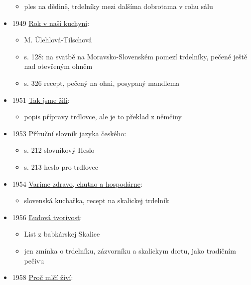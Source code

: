 \begin{itemize}
  \begin{itemize}
  \tightlist
  \item
    ples na dědině, trdelníky mezi dalšíma dobrotama v rohu sálu
  \end{itemize}
\item
  1949
  \href{https://ceskadigitalniknihovna.cz/uuid/uuid:3c65e0dc-eea0-4315-9819-a34d4fe39616}{Rok
  v naší kuchyni}:

  \begin{itemize}
  \tightlist
  \item
    M. Úlehlová-Tilschová
  \item
    s. 128: na svatbě na Moravsko-Slovenském pomezí trdelníky, pečené
    ještě nad otevřeným ohněm
  \item
    s. 326 recept, pečený na ohni, posypaný mandlema
  \end{itemize}
\item
  1951
  \href{https://ceskadigitalniknihovna.cz/view/uuid:20d0de00-02ba-11e5-9506-005056827e51?page=uuid\%3Ad5741950-0ec5-11e5-b562-005056827e51&fulltext=trdlovec*\%20OR\%20trdlovcem&source=mzk}{Tak
  jsme žili}:

  \begin{itemize}
  \tightlist
  \item
    popis přípravy trdlovce, ale je to překlad z němčiny
  \end{itemize}
\item
  1953
  \href{https://ceskadigitalniknihovna.cz/uuid/uuid:b65792bb-dbc4-4d41-b1da-e0aec484459d}{Příruční
  slovník jazyka českého}:

  \begin{itemize}
  \tightlist
  \item
    s. 212 slovníkový Heslo
  \item
    s. 213 heslo pro trdlovec
  \end{itemize}
\item
  1954
  \href{https://dikda.snk.sk/uuid/uuid:38df4d2e-5eea-4484-9e22-e5a1080ba4e3}{Varíme
  zdravo, chutno a hospodárne}:

  \begin{itemize}
  \tightlist
  \item
    slovenská kuchařka, recept na skalickej trdelník
  \end{itemize}
\item
  1956
  \href{https://dikda.snk.sk/uuid/uuid:906d894f-daa0-4fa8-9756-804e856a0d44}{Ľudová
  tvorivosť}:

  \begin{itemize}
  \tightlist
  \item
    List z babkárskej Skalice
  \item
    jen zmínka o trdelníku, zázvorníku a skalickym dortu, jako tradičním
    pečivu
  \end{itemize}
\item
  1958
  \href{https://ceskadigitalniknihovna.cz/uuid/uuid:4d82e3c0-db26-11e2-9923-005056827e52}{Proč
  mlčí živí}:


\end{itemize}
